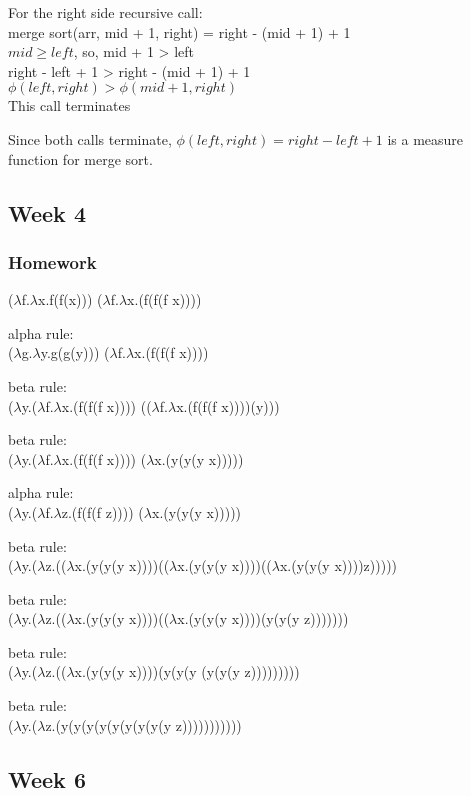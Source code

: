 \documentclass{article}
\theoremstyle{theorem}
\theoremstyle{definition}
\theoremstyle{remark}
\begin{document}
For the right side recursive call:\\
merge sort(arr, mid + 1, right) = right - (mid + 1) + 1\\
$mid \ge left$, so, mid + 1 > left\\
right - left + 1 > right - (mid + 1) + 1 \\
$\phi(left, right) > \phi(mid + 1, right)$\\
This call terminates

Since both calls terminate, $\phi(left, right) = right - left + 1$ is a measure function for merge sort.

\subsection{Week 4}

\subsubsection{Homework}

($\lambda$f.$\lambda$x.f(f(x))) ($\lambda$f.$\lambda$x.(f(f(f x))))

alpha rule:\\
($\lambda$g.$\lambda$y.g(g(y))) ($\lambda$f.$\lambda$x.(f(f(f x))))

beta rule:\\
($\lambda$y.($\lambda$f.$\lambda$x.(f(f(f x)))) (($\lambda$f.$\lambda$x.(f(f(f x))))(y)))

beta rule:\\
($\lambda$y.($\lambda$f.$\lambda$x.(f(f(f x)))) ($\lambda$x.(y(y(y x)))))

alpha rule:\\
($\lambda$y.($\lambda$f.$\lambda$z.(f(f(f z)))) ($\lambda$x.(y(y(y x)))))

beta rule:\\
($\lambda$y.($\lambda$z.(($\lambda$x.(y(y(y x))))(($\lambda$x.(y(y(y x))))(($\lambda$x.(y(y(y x))))z)))))

beta rule:\\
($\lambda$y.($\lambda$z.(($\lambda$x.(y(y(y x))))(($\lambda$x.(y(y(y x))))(y(y(y z)))))))

beta rule:\\
($\lambda$y.($\lambda$z.(($\lambda$x.(y(y(y x))))(y(y(y (y(y(y z)))))))))

beta rule:\\
($\lambda$y.($\lambda$z.(y(y(y(y(y(y(y(y(y z)))))))))))

\subsection{Week 6}
\end{document}
